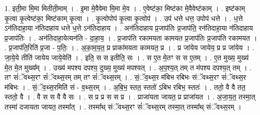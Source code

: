 \documentclass[17pt]{extarticle}
\begin{document}
1. इती॒मा मि॒मा मितीती॒माम् । . इ॒मा मे॒वैवेमा मि॒मा मे॒व । . ए॒वेष्ट॑का॒ मिष्ट॑का मे॒वैवेष्ट॑काम् । . इष्ट॑काम् कृ॒त्वा कृ॒त्वेष्ट॑का॒ मिष्ट॑काम् कृ॒त्वा । . कृ॒त्वोपोप॑ कृ॒त्वा कृ॒त्वोप॑ । . उप॑ धत्ते धत्त॒ उपोप॑ धत्ते । . ध॒त्ते ऽन॑तिदाहा॒या न॑तिदाहाय धत्ते ध॒त्ते ऽन॑तिदाहाय । . अन॑तिदाहाय प्र॒जाप॑तिः प्र॒जाप॑ति॒ रन॑तिदाहा॒या न॑तिदाहाय प्र॒जाप॑तिः । . अन॑तिदाहा॒येत्यन॑ति - दा॒हा॒य॒ । . प्र॒जाप॑ति रकामयता कामयत प्र॒जाप॑तिः प्र॒जाप॑ति रकामयत । . प्र॒जाप॑ति॒रिति॑ प्र॒जा - प॒तिः॒ । . अ॒का॒म॒य॒त॒ प्र प्राका॑मयता कामयत॒ प्र । . प्र जा॑येय जायेय॒ प्र प्र जा॑येय । . जा॒ये॒ये तीति॑ जायेय जाये॒येति॑ । . इति॒ स स इतीति॒ सः । . स ए॒त मे॒तꣳ स स ए॒तम् । . ए॒त मुख्य॒ मुख्य॑ मे॒त मे॒त मुख्य᳚म् । . उख्य॑ मपश्य दपश्य॒ दुख्य॒ मुख्य॑ मपश्यत् । . अ॒प॒श्य॒त् तम् त म॑पश्य दपश्य॒त् तम् । . तꣳ सं॑ॅवथ्स॒रꣳ सं॑ॅवथ्स॒रम् तम् तꣳ सं॑ॅवथ्स॒रम् । . सं॒ॅव॒थ्स॒र म॑बिभ रबिभः संॅवथ्स॒रꣳ सं॑ॅवथ्स॒र म॑बिभः । . सं॒ॅव॒थ्स॒रमिति॑ सं - व॒थ्स॒रम् । . अ॒बि॒भ॒ स्तत॒ स्ततो॑ ऽबिभ रबिभ॒ स्ततः॑ । . ततो॒ वै वै तत॒ स्ततो॒ वै । . वै स स वै वै सः । . स प्र प्र स स प्र । . प्राजा॑यता जायत॒ प्र प्राजा॑यत । . अ॒जा॒य॒त॒ तस्मा॒त् तस्मा॑ दजायता जायत॒ तस्मा᳚त् । . तस्मा᳚थ् संॅवथ्स॒रꣳ सं॑ॅवथ्स॒रम् तस्मा॒त् तस्मा᳚थ् संॅवथ्स॒रम् । \newline
\end{document}
